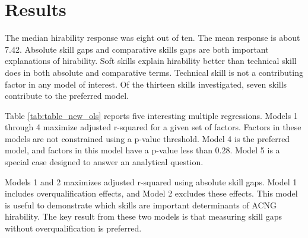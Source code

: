 \section{Results}

The median hirability response was eight out of ten.
The mean response is about 7.42.
Absolute skill gaps and comparative skills gaps are both important explanations of hirability.
Soft skills explain hirability better than technical skill does in both absolute and comparative terms.
Technical skill is not a contributing factor in any model of interest.
Of the thirteen skills investigated, seven skills contribute to the preferred model.







Table \ref{tab:table_new_ols} reports five interesting multiple regressions.
Models 1 through 4 maximize adjusted r-squared for a given set of factors.
Factors in these models are not constrained using a p-value threshold.
Model 4 is the preferred model, and factors in this model have a p-value less than $0.28$.
Model 5 is a special case designed to answer an analytical question.

Models 1 and 2 maximizes adjusted r-squared using absolute skill gaps.
Model 1 includes overqualification effects, and Model 2 excludes these effects.
This model is useful to demonstrate which skills are important determinants of ACNG hirability.
The key result from these two models is that measuring skill gaps without overqualification is preferred.

